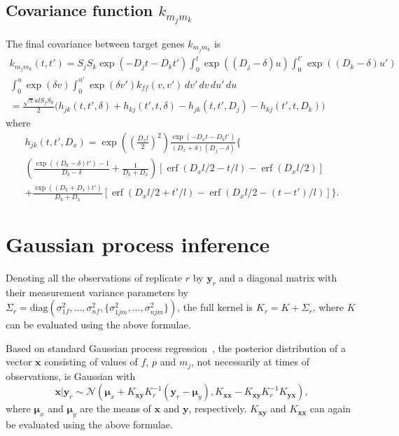 \documentclass{article}
\newcommand{\erf}{\operatorname{erf}}
\begin{document}
\subsection{Covariance function $k_{m_j m_k}$}

The final covariance between target genes $k_{m_j m_k}$ is
\begin{multline}
  k_{m_j m_k}(t, t') = S_j S_k \exp(-D_j t - D_k t')
  \int_0^t \exp((D_j - \delta) u)
  \int_0^{t'} \exp((D_k - \delta) u') \\
  \int_0^u \exp(\delta v) \int_0^{u'} \exp(\delta v') k_{ff}(v, v') \, dv'\, dv\, du'\, du \\
  = \frac{\sqrt{\pi} a l S_j S_k}{2} \bigg(
  h_{jk}(t, t', \delta) + h_{kj}(t', t, \delta) 
  - h_{jk}(t, t', D_j) - h_{kj}(t', t, D_k)
  \bigg)
\end{multline}
where
\begin{multline}
  h_{jk}(t, t', D_x) = 
  \exp\left(\left(\frac{D_x l}{2}\right)^2\right)
  \frac{\exp(-D_x t - D_k t')}{(D_x + \delta) (D_j - \delta)}
  \bigg\{ 
   \\
  \left(\frac{\exp((D_k-\delta) t') - 1}{D_k-\delta} +
    \frac{1}{D_k + D_x} \right)
  [\erf(D_x l/2 - t/l) - \erf(D_x l/2)]
  \\
  + \frac{\exp((D_k+D_x)t')}{D_k+D_x}
  [\erf(D_x l/2 + t'/l)
  - \erf(D_x l/2 - (t-t')/l)]
  \bigg\}.
\end{multline}

\section{Gaussian process inference}

Denoting all the observations of replicate $r$ by $\bm y_r$ and a
diagonal matrix with their measurement variance parameters by
$\Sigma_r = \mathrm{diag}(\sigma_{1f}^2, \ldots, \sigma_{nf}^2,
\{\sigma_{1jm}^2, \ldots, \sigma_{njm}^2\})$, the
full kernel is $K_r = K + \Sigma_r$, where $K$ can be evaluated using
the above formulae.

Based on standard Gaussian process regression~\cite{Rasmussen2006},
the posterior distribution of a vector $\bm x$ consisting of values of
$f$, $p$ and $m_j$, not necessarily at times of observations, is
Gaussian with
\begin{equation}
  \label{eq:gp_posterior}
  \bm x | \bm y_r \sim 
  \mathcal{N}(\bm \mu_x + K_{\bm x \bm y} K_r^{-1} (\bm y_r - \bm \mu_y),
  K_{\bm x \bm x} - K_{\bm x \bm y} K_r^{-1} K_{\bm y \bm x}),
\end{equation}
where $\bm \mu_x$ and $\bm \mu_y$ are the means of $\bm x$ and $\bm
y$, respectively.  $K_{\bm x \bm y}$ and $K_{\bm x \bm x}$ can again
be evaluated using the above formulae.
\end{document}
